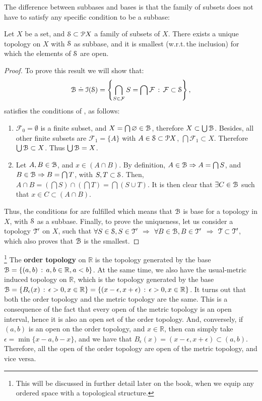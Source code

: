 The difference between subbases and bases is that the family of subsets does not have
to satisfy any specific condition to be a subbase:

\begin{theorem}
	Let $X$ be a set, and $\S\subset \P X$ a family of subsets of $X$.
	There exists a unique topology on $X$ with $\S$ as subbase, and it is smallest
	(w.r.t.\,the inclusion) for which the elements of $\S$ are open.
	\label{th:1-4}
\end{theorem}

\begin{proof}
	To prove this result we will show that:
	\[
	\B\doteq \I(\S)=\left\{\bigcap_{S\in\mathcal{F}} S=\bigcap\mathcal{F}\,:\,\mathcal{F}\subset \S\right\},
	\]
	satisfies the conditions of , as follows:
	\begin{enumerate}
		\item $\mathcal{F}_{0}=\emptyset$ is a finite subset, and $X=\bigcap \emptyset\in\B$, therefore $X\subset
		\bigcup\B$.
		Besides, all other finite subsets are $\mathcal{F}_{1}=\{A\}$ with $A\in\S
		\subset\P X$, $\bigcap\mathcal{F}_{1}\subset X$.
		Therefore $\bigcup \B\subset X$.
		Thus $\bigcup\B = X$.
		\item Let $A, B\in \B$, and $x\in (A\cap B)$.
		By definition, $A\in\B \Rightarrow A=\bigcap S$,
		and $B\in \B \Rightarrow B =\bigcap T$, with $S, T\subset \S$.
		Then, $A\cap B = \left(\bigcap S\right)\cap\left(\bigcap T\right)=\bigcap (S\cup T)$.
		It is then clear that $\exists C\in\B$ such that $x\in C\subset (A\cap B)$.
	\end{enumerate}
	Thus, the conditions for  are fulfilled which means that
	$\B$ is base for a topology in $X$, with $\S$ as a subbase.
	Finally, to prove the uniqueness, let us consider a topology $\T'$ on $X$, 
	such that $\forall S\in \S, S\in \T'$ $\Rightarrow$ $\forall B\in\B, B\in\T'$ 
	$\Rightarrow$ $\T\subset \T'$, which also proves that $\B$ is the smallest.
\end{proof}

\begin{example}
	\footnote{This will be discussed in further detail later on the book, when
	we equip any ordered space with a topological structure.}
	The \textbf{order topology} on $\mathbb{R}$ is the topology generated by the
	base $\B=\setdef{(a,b)}{a,b\in\mathbb{R}, a<b}$. At the same time, we also have
	the usual-metric induced topology on $\mathbb{R}$, which is the topology
	generated by the base $\B=\setdef{B_\epsilon(x)}{\epsilon>0, x\in\mathbb{R}} = \setdef{(x-\epsilon, x+\epsilon)}{\epsilon>0, x\in\mathbb{R}}$.
	It turns out that both the order topology and the metric topology are the same.
	This is a consequence of the fact that every open of the metric topology is an
	open interval, hence it is also an open set of the order topology. And, conversely,
	if $(a,b)$ is an open on the order topology, and $x\in\mathbb{R}$, then can simply
	take $\epsilon=\min\{x-a, b-x\}$, and we have that $B_\epsilon(x)=(x-\epsilon, x+\epsilon)\subset (a,b)$.
	Therefore, all the open of the order topology are open of the metric topology, and
	vice versa.
\end{example}

